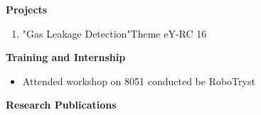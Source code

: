 \documentclass{article}
\begin{document}
\begin{flushleft}
\textbf{Projects }
\begin{flushright}
\begin{enumerate}
\item "Gas Leakage Detection"Theme eY-RC 16
\end{enumerate} 
\end{flushright}
\end{flushleft}



\begin{flushleft}
\textbf{Training and Internship}
\begin{flushright}
\begin{itemize}
\item Attended workshop on 8051 conducted be RoboTryst
\end{itemize} 
\end{flushright}
\end{flushleft}


\begin{flushleft}
\textbf{Research Publications }
\end{flushleft}
\end{document}
